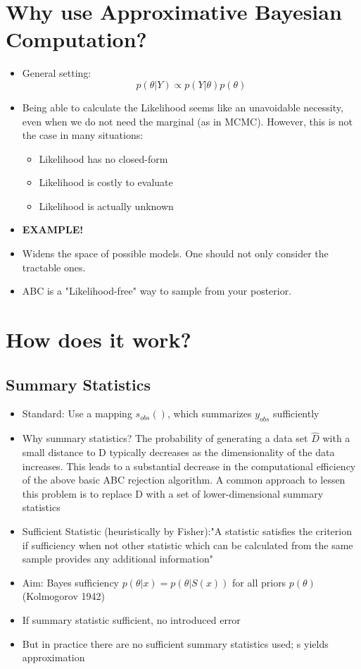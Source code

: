 \documentclass[10pt,a4paper]{report}
\begin{document}
\chapter{Why use Approximative Bayesian Computation?}
\begin{itemize}
\item General setting: \begin{equation}
p(\theta|Y) \propto p(Y|\theta)p(\theta)
\end{equation}
\item Being able to calculate the Likelihood seems like an unavoidable necessity, even when we do not need the marginal (as in MCMC). However, this is not the case in many situations: 
\begin{itemize}
\item Likelihood has no closed-form
\item Likelihood is costly to evaluate
\item Likelihood is actually unknown
\end{itemize}
\item \textbf{EXAMPLE!}
\item Widens the space of possible models. One should not only consider the tractable ones. 
\item ABC is a "Likelihood-free" way to sample from your posterior.
\end{itemize}




\chapter{How does it work?}

\section{Summary Statistics}
\begin{itemize}

\item Standard: Use a mapping $s_{obs}()$, which summarizes $y_{obs}$ sufficiently 
\item Why summary statistics? The probability of generating a data set $\hat {D}$ with a small distance to D typically decreases as the dimensionality of the data increases. This leads to a substantial decrease in the computational efficiency of the above basic ABC rejection algorithm. A common approach to lessen this problem is to replace D with a set of lower-dimensional summary statistics 
\item Sufficient Statistic (heuristically by Fisher):"A statistic satisfies the criterion if sufficiency when not other statistic which can be calculated from the same sample provides any additional information"
\item Aim: Bayes sufficiency $p(\theta|x)=p(\theta|S(x))$ for all priors $p(\theta)$ (Kolmogorov 1942)
\item If summary statistic sufficient, no introduced error
\item But in practice there are no sufficient summary statistics used; s yields approximation
\end{itemize}
\end{document}
